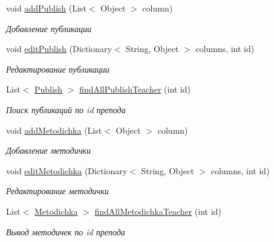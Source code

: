 \begin{DoxyCompactItemize}
void \mbox{\hyperlink{classpatterns_kursach_1_1data_mapper_1_1_teacher_mapper_ab509a0e07dc0a043e8614175fb37f5a4}{add\+Publish}} (List$<$ Object $>$ column)
\begin{DoxyCompactList}\small\item\em Добавление публикации \end{DoxyCompactList}\item 
void \mbox{\hyperlink{classpatterns_kursach_1_1data_mapper_1_1_teacher_mapper_a648d4abde78e6307655e63dd5e06a3e1}{edit\+Publish}} (Dictionary$<$ String, Object $>$ columns, int id)
\begin{DoxyCompactList}\small\item\em Редактирование публикации \end{DoxyCompactList}\item 
List$<$ \mbox{\hyperlink{classpatterns_kursach_1_1_publish}{Publish}} $>$ \mbox{\hyperlink{classpatterns_kursach_1_1data_mapper_1_1_teacher_mapper_a8be2eb4ccd82f13bb9ab0414e23490be}{find\+All\+Publish\+Teacher}} (int id)
\begin{DoxyCompactList}\small\item\em Поиск публикаций по id препода ~\newline
\end{DoxyCompactList}\item 
void \mbox{\hyperlink{classpatterns_kursach_1_1data_mapper_1_1_teacher_mapper_a21cf5b7c9d6155c827a270df3a3d521b}{add\+Metodichka}} (List$<$ Object $>$ column)
\begin{DoxyCompactList}\small\item\em Добавление методички \end{DoxyCompactList}\item 
void \mbox{\hyperlink{classpatterns_kursach_1_1data_mapper_1_1_teacher_mapper_abb385030600ac3bbbaf4b2c457203cd4}{edit\+Metodichka}} (Dictionary$<$ String, Object $>$ columns, int id)
\begin{DoxyCompactList}\small\item\em Редактирование методички \end{DoxyCompactList}\item 
List$<$ \mbox{\hyperlink{classpatterns_kursach_1_1_metodichka}{Metodichka}} $>$ \mbox{\hyperlink{classpatterns_kursach_1_1data_mapper_1_1_teacher_mapper_ab481eae3c59669cdc4e2c51bf25676bb}{find\+All\+Metodichka\+Teacher}} (int id)
\begin{DoxyCompactList}\small\item\em Вывод методичек по id препода \end{DoxyCompactList}\end{DoxyCompactItemize}


